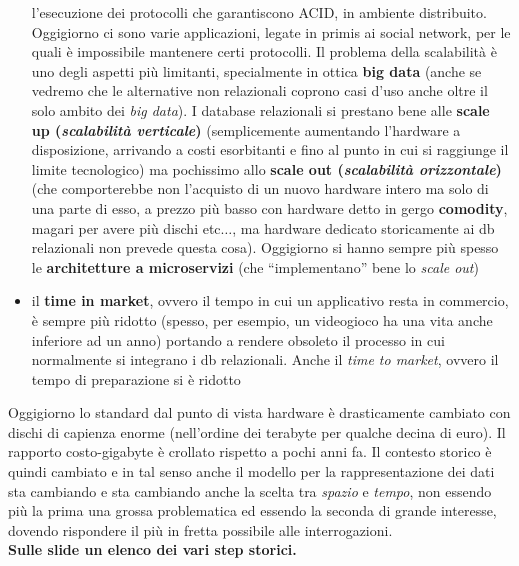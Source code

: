 \documentclass[a4paper,12pt, oneside]{book}
\begin{document}
\begin{itemize}
  l'esecuzione dei protocolli che garantiscono ACID, in ambiente
  distribuito. Oggigiorno ci sono varie applicazioni, legate in primis ai social
  network, per le quali è impossibile mantenere certi protocolli. Il problema
  della scalabilità è uno degli aspetti più limitanti, specialmente in ottica
  \textbf{big data} (anche se vedremo che le alternative non relazionali coprono
  casi d'uso anche oltre il solo ambito dei \textit{big data}). I database
  relazionali si prestano bene alle \textbf{scale up (\textit{scalabilità
      verticale})} (semplicemente aumentando
  l'hardware a disposizione, arrivando a costi esorbitanti e fino al punto in
  cui si raggiunge il limite tecnologico) ma pochissimo allo \textbf{scale out
    (\textit{scalabilità orizzontale})} (che comporterebbe non l'acquisto di un
  nuovo hardware intero ma solo di una parte di esso, a prezzo più basso con
  hardware detto in gergo \textbf{comodity},
  magari per avere più dischi etc$\ldots$, ma hardware dedicato storicamente ai
  db relazionali non prevede questa cosa). Oggigiorno si hanno sempre più spesso
  le \textbf{architetture a microservizi} (che ``implementano'' bene lo
  \textit{scale out})
  \item il \textbf{time in market}, ovvero il tempo in cui un applicativo resta
  in commercio, è sempre più ridotto (spesso, per esempio, un videogioco ha una
  vita anche inferiore ad un anno) portando a rendere obsoleto il processo in
  cui normalmente si integrano i db relazionali. Anche il \textit{time to
    market}, ovvero il tempo di preparazione si è ridotto
\end{itemize}
Oggigiorno lo standard dal punto di vista hardware è drasticamente cambiato con
dischi di capienza enorme (nell'ordine dei terabyte per qualche decina di euro).
Il rapporto costo-gigabyte è crollato rispetto a pochi anni fa. Il contesto
storico è quindi cambiato e in tal senso anche il modello per la
rappresentazione dei dati sta cambiando e sta cambiando anche la scelta tra
\textit{spazio} e \textit{tempo}, non essendo più la prima una grossa
problematica ed essendo la seconda di grande interesse, dovendo rispondere il
più in fretta possibile alle interrogazioni.\\
\textbf{Sulle slide un elenco dei vari step storici.}
\end{document}
